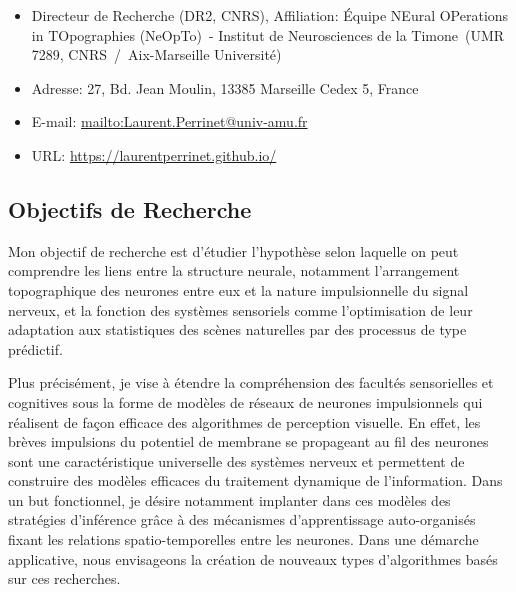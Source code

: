 \documentclass[10pt,french,a4paper,oneside]{article}%
\makeatletter
\newcommand{\Team}{\'Equipe NEural OPerations in TOpographies (NeOpTo)}%
\newcommand{\Institute}{Institut de Neurosciences de la Timone}%
\newcommand{\InstituteUMR}{UMR 7289, CNRS~/~Aix-Marseille Université}%
\newcommand{\Address}{27, Bd. Jean Moulin, 13385 Marseille Cedex 5, France}
\newcommand{\Website}{https://laurentperrinet.github.io/}
\newcommand{\Email}{Laurent.Perrinet@univ-amu.fr}
\makeatother
\begin{document}
\begin{itemize}
\item Directeur de Recherche (DR2, CNRS), Affiliation: \Team\ - \Institute\ (\InstituteUMR)
\item Adresse: \Address
\item E-mail: \url{mailto:\Email}
\item URL: \url{\Website}
\end{itemize}


\subsection*{Objectifs de Recherche}

Mon objectif de recherche est d'étudier l'hypothèse selon laquelle on peut comprendre les liens entre la structure neurale, notamment l'arrangement topographique des neurones entre eux et la nature impulsionnelle du signal nerveux, et la fonction des systèmes sensoriels comme l'optimisation de leur adaptation aux statistiques des scènes naturelles par des processus de type prédictif.

Plus précisément, je vise à étendre la compréhension des facultés sensorielles et cognitives sous la forme de modèles de réseaux de neurones impulsionnels qui réalisent de façon efficace des algorithmes de  perception visuelle. En effet, les brèves impulsions du potentiel de membrane se propageant au fil des neurones sont une caractéristique universelle des systèmes nerveux et permettent de construire des modèles efficaces du traitement dynamique de l'information. Dans un but fonctionnel, je désire notamment implanter dans ces modèles des stratégies d'inférence grâce à des mécanismes d'apprentissage auto-organisés fixant les relations spatio-temporelles entre les neurones. Dans une démarche applicative, nous envisageons la création de nouveaux types d'algorithmes basés sur ces recherches.
\end{document}
